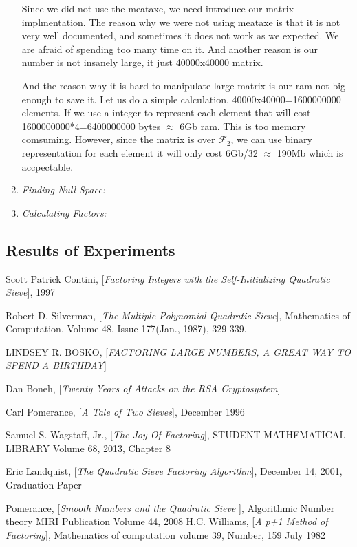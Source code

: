 \documentclass[12pt]{article} %
\begin{document}
\begin{enumerate}
Since we did not use the meataxe, we need introduce our matrix implmentation. The reason why we were not using meataxe is that it is not very well documented, and sometimes it does not work as we expected. We are afraid of spending too many time on it. And another reason is our number is not insanely large, it just 40000x40000 matrix. 

And the reason why it is hard to manipulate large matrix is our ram not big enough to save it. Let us do a simple calculation, 40000x40000=1600000000 elements. If we use a integer to represent each element that will cost 1600000000*4=6400000000 bytes $\approx$ 6Gb ram. This is too memory comsuming. However, since the matrix is over $\mathcal{F}_2$, we can use binary representation for each element it will only cost 6Gb/32 $\approx$ 190Mb which is accpectable. 

\item \textit{Finding Null Space:}

\lipsum[1-2]

\item \textit{Calculating Factors:}

\lipsum[3-4]

\end{enumerate}

\subsection {Results of Experiments}

\pagebreak
\begin{thebibliography}{99}

 Scott Patrick Contini, [\textit{Factoring Integers with the Self-Initializing Quadratic Sieve}], 1997

 Robert D. Silverman, [\textit{The Multiple Polynomial Quadratic Sieve}], Mathematics of Computation, Volume 48, Issue 177(Jan., 1987), 329-339.

 LINDSEY R. BOSKO, [\textit{FACTORING LARGE NUMBERS, A GREAT WAY TO SPEND A BIRTHDAY}]

 Dan Boneh, [\textit{Twenty Years of Attacks on the RSA Cryptosystem}]

 Carl Pomerance, [\textit{A Tale of Two Sieves}], December 1996

 Samuel S. Wagstaff, Jr., [\textit{The Joy Of Factoring}], STUDENT MATHEMATICAL LIBRARY Volume 68, 2013, Chapter 8

 Eric Landquist, [\textit{The Quadratic Sieve Factoring Algorithm}], December 14, 2001, Graduation Paper

 Pomerance, [\textit{Smooth Numbers and the Quadratic Sieve }], Algorithmic Number theory MIRI Publication Volume 44, 2008
 H.C. Williams, [\textit{A p+1 Method of Factoring}], Mathematics of computation volume 39, Number, 159 July 1982

\end{thebibliography}

 
\end{document}
